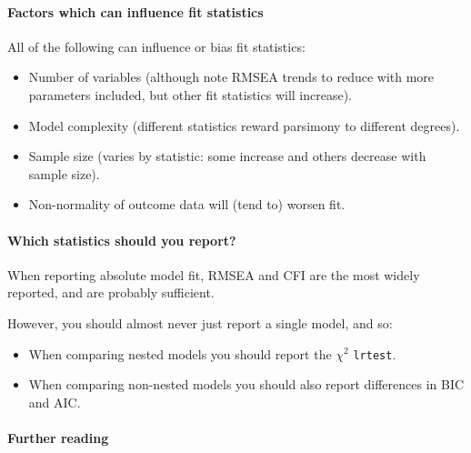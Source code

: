 \documentclass[]{article}
\providecommand{\tightlist}{%
  \setlength{\itemsep}{0pt}\setlength{\parskip}{0pt}}
\let\oldparagraph\paragraph
\renewcommand{\paragraph}[1]{\oldparagraph{#1}\mbox{}}
\begin{document}
\hypertarget{factors-which-can-influence-fit-statistics}{%
\paragraph{Factors which can influence fit statistics}\label{factors-which-can-influence-fit-statistics}}

All of the following can influence or bias fit statistics:

\begin{itemize}
\tightlist
\item
  Number of variables (although note RMSEA trends to reduce with more
  parameters included, but other fit statistics will increase).
\item
  Model complexity (different statistics reward parsimony to different
  degrees).
\item
  Sample size (varies by statistic: some increase and others decrease with
  sample size).
\item
  Non-normality of outcome data will (tend to) worsen fit.
\end{itemize}

\hypertarget{which-statistics-should-you-report}{%
\paragraph{Which statistics should you report?}\label{which-statistics-should-you-report}}

When reporting absolute model fit, RMSEA and CFI are the most widely reported,
and are probably sufficient.

However, you should almost never just report a single model, and so:

\begin{itemize}
\tightlist
\item
  When comparing nested models you should report the \(\chi^2\) \texttt{lrtest}.
\item
  When comparing non-nested models you should also report differences in BIC
  and AIC.
\end{itemize}

\hypertarget{further-reading}{%
\paragraph{Further reading}\label{further-reading}}
\end{document}
